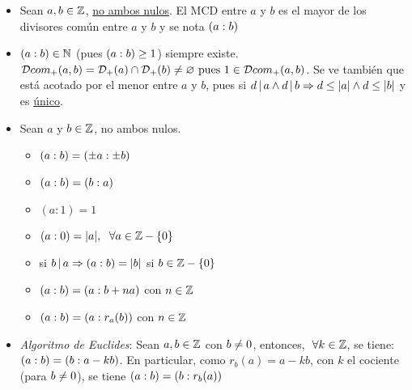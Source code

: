\begin{itemize}
	\item Sean $a,b \in \mathbb Z$, \underline{no ambos nulos}. El MCD entre $a$ y $b$ es el mayor de los divisores
	      común entre $a$ y $b$ y se nota $(a:b)$

	\item $(a:b) \in \mathbb N$ (pues $(a:b) \geq 1$) siempre existe.
	      $\mathcal D com_+(a,b) = \mathcal D_+(a) \cap \mathcal D_+(b) \neq \varnothing
		      \text{ pues } 1 \in \mathcal D com_+(a,b)$.
	      Se ve también que está acotado por el menor entre $a$ y $b$, pues si
	      $d \, | \, a \land d \, | \, b \Rightarrow d \leq |a| \land d \leq|b|$ y es \underline{único}.

	\item Sean $a$ y $b \in \mathbb Z$, no ambos nulos.\\
	      \begin{itemize}
		      \item $(a:b) = (\pm a : \pm b)$
		      \item $(a:b) = (b:a)$
		      \item $(a:1) = 1$
		      \item $(a:0) = |a|,\ \;\forall a \in \mathbb Z -\left\{ 0 \right\}$
		      \item si $b \, | \, a \Rightarrow (a:b) = |b|$ si $b \in \mathbb Z - \left\{ 0 \right\}$
		      \item $(a:b) = (a: b+na)$ con $n \in \mathbb Z$
		      \item $(a:b) = (a: r_a(b))$ con $n \in \mathbb Z$
	      \end{itemize}

	\item \textit{Algoritmo de Euclides}:
	      Sean $a, b \in \mathbb Z$ con $b \neq 0$, entonces, $\;\forall k \in \mathbb Z$, se tiene:
	      $(a:b) = (b:a-kb)$. En particular, como $r_b(a) = a-kb$, con $k$ el cociente (para $b\neq 0$), se tiene
	      $(a:b) = (b: r_b(a))$


\end{itemize}
